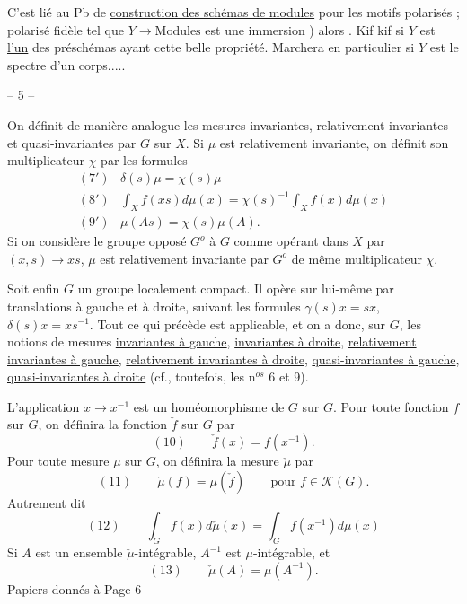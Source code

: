C’est lié au Pb de \uline{construction des schémas de modules} pour les motifs
polarisés ;  polarisé fidèle tel que
$Y\longrightarrow\mathrm{Modules}$ est une immersion
)
 alors  .
Kif kif si $Y$ est \uline{l’un} des préschémas ayant cette belle propriété.
Marchera en particulier si $Y$ est le spectre d’un corps.....
\begin{center}-- 5 --\end{center}
On définit de manière analogue les mesures invariantes, relativement invariantes
et quasi-invariantes par $G$ sur $X$. Si $\mu$ est relativement invariante,
on définit son multiplicateur $\chi$ par les formules
\[
\begin{array}{ll}
(7') & \delta(s)\mu=\chi(s)\mu\\
(8') & \displaystyle\int_X f(xs)d\mu(x)=\chi(s)^{-1}\int_X f(x)d\mu(x)\\
(9') & \mu(As)=\chi(s)\mu(A).
\end{array}
\]
Si on considère le groupe opposé $G^o$ à $G$ comme opérant dans $X$ par
$(x,s)\longrightarrow xs$, $\mu$ est relativement invariante par $G^o$
de même multiplicateur $\chi$.

Soit enfin $G$ un groupe localement compact. Il opère sur lui-même par translations
à gauche et à droite, suivant les formules $\gamma(s)x=sx$, $\delta(s)x=xs^{-1}$.
Tout ce qui précède est applicable, et on a donc, sur $G$, les notions de mesures
\uline{invariantes à gauche}, \uline{invariantes à droite},
\uline{relativement invariantes à gauche}, \uline{relativement invariantes à droite},
\uline{quasi-invariantes à gauche}, \uline{quasi-invariantes à droite}
(cf., toutefois, les n$^{os}$ 6 et 9).

L’application $x\longrightarrow x^{-1}$ est un homéomorphisme de $G$ sur $G$.
Pour toute fonction $f$ sur $G$, on définira la fonction $\check f$ sur $G$ par
\[
(10)\qquad\check f(x)=f(x^{-1}).
\]
Pour toute mesure $\mu$ sur $G$, on définira la mesure $\check\mu$ par
\[
(11)\qquad\check\mu(f)=\mu(\check f)\qquad\text{pour }f\in\mathcal K(G).
\]
Autrement dit
\[
(12)\qquad\int_G f(x)d\check\mu(x)=\int_G f(x^{-1})d\mu(x)
\]
Si $A$ est un ensemble $\check\mu$-intégrable, $A^{-1}$ est $\mu$-intégrable, et
\[
(13)\qquad\check\mu(A)=\mu(A^{-1}).
\]
Papiers donnés à 
Page 6

